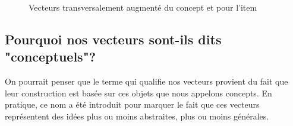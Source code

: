 \begin{figure}[h]
    \caption{Vecteurs transversalement augmenté du concept  
       et pour l'item }
    \label{l2-peace-vector}
\end{figure}

\subsection{Pourquoi nos vecteurs sont-ils dits "conceptuels"?}
\label{sec:pq-nom-VC}

On pourrait penser que le terme  qui qualifie nos
vecteurs provient du fait que leur construction est basée sur ces
objets que nous appelons concepts. En pratique, ce nom a été introduit
pour marquer le fait que ces vecteurs représentent des idées plus ou
moins abstraites, plus ou moins générales.

